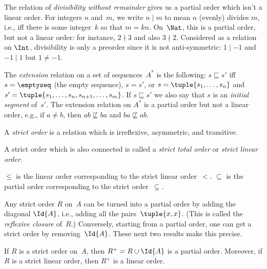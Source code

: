 \documentclass[../../../include/open-logic-section]{subfiles}
\begin{document}
\begin{ex}
The relation of \emph{divisibility without remainder} gives us a
partial order which isn't a linear order. For integers $n$ and~$m$, we
write $n \mid m$ to mean $n$ (evenly) divides $m$, i.e., iff there is
some integer~$k$ so that $m = kn$. On~$\Nat$, this is a partial order,
but not a linear order: for instance, $2 \nmid 3$ and also $3 \nmid
2$. Considered as a relation on $\Int$, divisibility is only a
preorder since it is not anti-symmetric: $1 \mid -1$ and $-1 \mid 1$
but $1 \neq -1$.
\end{ex}

\begin{ex}
The \emph{extension} relation on a set of sequences~$A^*$ is the
following: $s \sqsubseteq s'$ iff $s = \emptyseq$ (the empty
sequence), $s = s'$, or $s = \tuple{s_1, \dots, s_n}$ and $s' =
\tuple{s_1, \dots, s_n, s_{n+1}, \dots, s_m}$. If $s \sqsubseteq s'$
we also say that $s$ is an \emph{initial segment} of~$s'$. The
extension relation on $A^*$ is a partial order but not a linear order,
e.g., if $a \neq b$, then $ab \not\sqsubseteq ba$ and $ba \not\sqsubseteq ab$.
\end{ex}

\begin{defn}
A \emph{strict order} is a relation which is irreflexive, asymmetric,
and transitive.
\end{defn}

\begin{defn}
A strict order which is also connected is called a 
\emph{strict total order} or \emph{strict linear order.}
\end{defn}

\begin{ex}
$\le$ is the linear order corresponding to the strict linear
order~$<$. $\subseteq$ is the partial order corresponding to the
strict order~$\subsetneq$.
\end{ex}

Any strict order $R$ on~$A$ can be turned into a partial order by
adding the diagonal $\Id{A}$, i.e., adding all the pairs~$\tuple{x,
x}$.  (This is called the \emph{reflexive closure} of~$R$.)
Conversely, starting from a partial order, one can get a strict order
by removing~$\Id{A}$. These next two results make this precise.

\begin{prop}
If $R$ is a strict order on~$A$, then $R^+ = R \cup \Id{A}$ is a
partial order. Moreover, if $R$ is a strict linear order, then $R^+$ is 
a linear order.
\end{prop}
\end{document}
